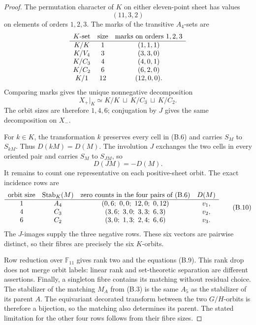 \documentclass[11pt]{article}
\theoremstyle{definition}
\theoremstyle{remark}
\newcommand{\F}{\mathbb{F}}
\begin{document}
\begin{proof}
The permutation character of \(K\) on either eleven-point sheet has
values
\[
 (11,3,2)
\]
on elements of orders \(1,2,3\).  The marks of the transitive
\(A_4\)-sets are
\[
\begin{array}{c@{\quad}c@{\quad}c}
\text{\(K\)-set}&\text{size}&\text{marks on orders \(1,2,3\)}\\ \hline
K/K&1&(1,1,1)\\
K/V_4&3&(3,3,0)\\
K/C_3&4&(4,0,1)\\
K/C_2&6&(6,2,0)\\
K/1&12&(12,0,0).
\end{array}
\]
Comparing marks gives the unique nonnegative decomposition
\[
 X_+|_K\simeq K/K\ \sqcup\ K/C_3\ \sqcup\ K/C_2.
\]
The orbit sizes are therefore \(1,4,6\); conjugation by \(J\) gives the
same decomposition on \(X_-\).

For \(k\in K\), the transformation \(k\) preserves every cell in
(B.6) and carries \(S_M\) to \(S_{kM}\).  Thus \(D(kM)=D(M)\).
The involution \(J\) exchanges the two cells in every oriented pair and
carries \(S_M\) to \(S_{JM}\), so
\[
 D(JM)=-D(M).
\]
It remains to count one representative on each positive-sheet orbit.
The exact incidence rows are
\[
\begin{array}{c@{\quad}c@{\quad}c@{\quad}c}
\text{orbit size}&\operatorname{Stab}_K(M)&
 \text{zero counts in the four pairs of (B.6)}&D(M)\\ \hline
1&A_4&(0,6;\ 0,0;\ 12,0;\ 0,12)&v_1,\\
4&C_3&(3,6;\ 3,0;\ 3,3;\ 6,3)&v_2,\\
6&C_2&(3,0;\ 1,3;\ 2,4;\ 6,6)&v_3.
\end{array}                                               \tag{B.10}
\]
The \(J\)-images supply the three negative rows.  These six vectors are
pairwise distinct, so their fibres are precisely the six \(K\)-orbits.

Row reduction over \(\F_{11}\) gives rank two and the equations (B.9).
This rank drop does not merge orbit labels: linear rank and
set-theoretic separation are different assertions.  Finally, a
singleton fibre contains its matching without residual choice.  The
stabilizer of the matching \(M_A\) from (B.3) is the same \(A_5\) as
the stabilizer of its parent \(A\).  The equivariant decorated transform between
the two \(G/H\)-orbits is therefore a bijection, so the matching also
determines its parent.  The stated limitation for the other four rows
follows from their fibre sizes.
\end{proof}
\end{document}
